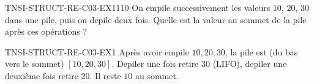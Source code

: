 
\begin{exercice}{TNSI-STRUCT-RE-C03-EX1}{1}{10}
On empile successivement les valeurs $10$, $20$, $30$ dans une pile, puis on depile deux fois. Quelle est la valeur au sommet de la pile après ces opérations ?
\end{exercice}


\begin{corrige}{TNSI-STRUCT-RE-C03-EX1}
Après avoir empile $10, 20, 30$, la pile est (du bas vers le sommet) $[10, 20, 30]$. Depiler une fois retire $30$ (LIFO), depiler une deuxième fois retire $20$. Il reste $10$ au sommet.
\end{corrige}
